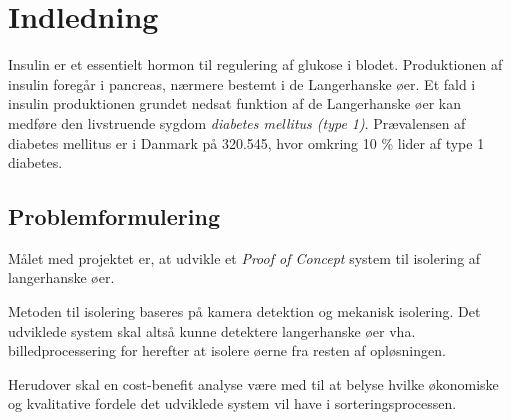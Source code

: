 \chapter{Indledning}
Insulin er et essentielt hormon til regulering af glukose i blodet. Produktionen af insulin foregår i pancreas, nærmere bestemt i de Langerhanske øer. Et fald i insulin produktionen grundet nedsat funktion af de Langerhanske øer kan medføre den livstruende sygdom \textit{diabetes mellitus (type 1)}. Prævalensen af diabetes mellitus er i Danmark på 320.545, hvor omkring 10 \% lider af type 1 diabetes. 









\section{Problemformulering}
Målet med projektet er, at udvikle et \textit{Proof of Concept} system til isolering af langerhanske øer.

Metoden til isolering baseres på kamera detektion og mekanisk isolering. Det udviklede system skal altså kunne detektere langerhanske øer vha. billedprocessering for herefter at  isolere øerne fra resten af opløsningen. 

Herudover skal en cost-benefit analyse være med til at belyse hvilke økonomiske og kvalitative fordele det udviklede system vil have i sorteringsprocessen.

